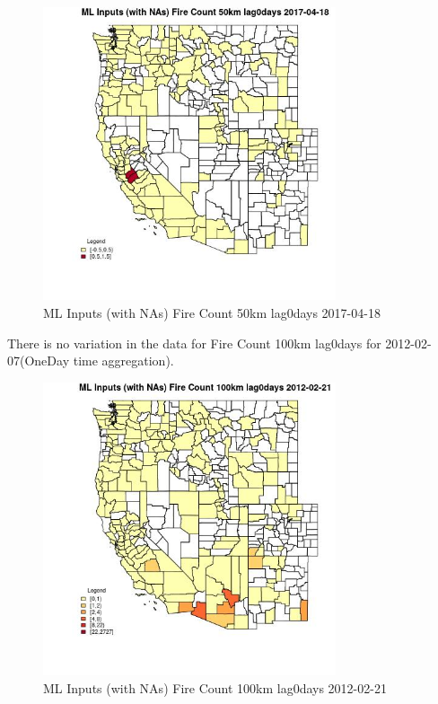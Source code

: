 \begin{figure} 
\centering  
\includegraphics[width=0.77\textwidth]{Code_Outputs/Report_ML_input_PM25_Step4_part_f_de_duplicated_aves_prioritize_24hr_obswNAs_CountyFire_Count_50km_lag0daysMean2017-04-18.jpg} 
\caption{\label{fig:Report_ML_input_PM25_Step4_part_f_de_duplicated_aves_prioritize_24hr_obswNAsCountyFire_Count_50km_lag0daysMean2017-04-18}ML Inputs (with NAs) Fire Count 50km lag0days 2017-04-18} 
\end{figure} 
 

There is no variation in the data for Fire Count 100km lag0days for 2012-02-07(OneDay time aggregation). 
 

\begin{figure} 
\centering  
\includegraphics[width=0.77\textwidth]{Code_Outputs/Report_ML_input_PM25_Step4_part_f_de_duplicated_aves_prioritize_24hr_obswNAs_CountyFire_Count_100km_lag0daysMean2012-02-21.jpg} 
\caption{\label{fig:Report_ML_input_PM25_Step4_part_f_de_duplicated_aves_prioritize_24hr_obswNAsCountyFire_Count_100km_lag0daysMean2012-02-21}ML Inputs (with NAs) Fire Count 100km lag0days 2012-02-21} 
\end{figure} 
 

